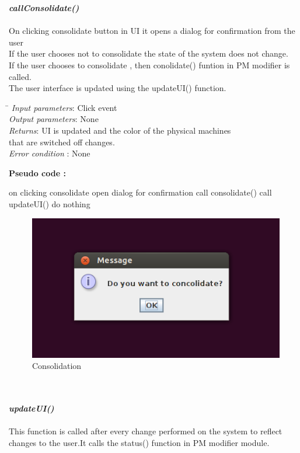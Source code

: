 \documentclass[a4paper,11pt]{article}
\begin{document}
\emph{\bf callConsolidate()}\\\\
On clicking consolidate button in UI it opens a dialog for confirmation from the user \\
If the user chooses not to consolidate the state of the system does not change.\\
If the user chooses to consolidate ,  then conolidate() funtion in PM modifier is called.
\\ The user interface is updated using the updateUI() function.
\\
  \begin{tabbing}
  \hspace*{4cm}\= \kill
\emph{Input parameters}\>: Click event
\\
\emph{Output parameters}\>: None \\
\emph{Returns}\>: UI is updated and the color of the physical machines\\ \> that are switched off changes.\\
\emph{Error condition} \>: None\\
\end{tabbing}
\textbf{Pseudo code :}
\begin{algorithmic}[1]
\STATE on clicking consolidate
\STATE open dialog for confirmation
\STATE call consolidate()
\STATE call updateUI()
\ELSE 
\STATE do nothing
\ENDIF
\end{algorithmic}
\begin{figure}[ht!]
\centering
\includegraphics[scale=0.6, angle=0]{images/5.png}
\caption{Consolidation}
\end{figure} 
\mbox{}\\\\
\emph{\bf updateUI()}\\\\
This function is called after every change performed on the system to reflect changes to the user.It calls the status() function in PM modifier module.
\end{document}
